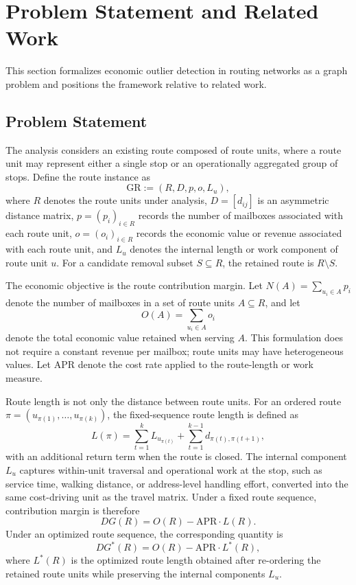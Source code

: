 \documentclass[preprint,12pt]{elsarticle}
\begin{document}
\section{Problem Statement and Related Work}
\label{sec:problem-statement-related-work}

This section formalizes economic outlier detection in routing networks as a graph problem and positions the framework relative to related work.

\subsection{Problem Statement}
\label{subsec:problem-statement}

The analysis considers an existing route composed of route units, where a route unit may represent either a single stop or an operationally aggregated group of stops. Define the route instance as
\[
\mathrm{GR}:=(R,D,p,o,L_u),
\]
where $R$ denotes the route units under analysis, $D = [d_{ij}]$ is an asymmetric distance matrix, $p=(p_i)_{i \in R}$ records the number of mailboxes associated with each route unit, $o=(o_i)_{i\in R}$ records the economic value or revenue associated with each route unit, and $L_u$ denotes the internal length or work component of route unit $u$. For a candidate removal subset $S \subseteq R$, the retained route is $R \setminus S$.

The economic objective is the route contribution margin. Let $N(A)=\sum_{u_i\in A}p_i$ denote the number of mailboxes in a set of route units $A\subseteq R$, and let
\[
O(A)=\sum_{u_i\in A}o_i
\]
denote the total economic value retained when serving $A$. This formulation does not require a constant revenue per mailbox; route units may have heterogeneous values. Let $\mathrm{APR}$ denote the cost rate applied to the route-length or work measure.

Route length is not only the distance between route units. For an ordered route $\pi=(u_{\pi(1)},\ldots,u_{\pi(k)})$, the fixed-sequence route length is defined as
\[
L(\pi)=
\sum_{t=1}^{k}L_{u_{\pi(t)}}
+\sum_{t=1}^{k-1}d_{\pi(t),\pi(t+1)} ,
\]
with an additional return term when the route is closed. The internal component $L_u$ captures within-unit traversal and operational work at the stop, such as service time, walking distance, or address-level handling effort, converted into the same cost-driving unit as the travel matrix. Under a fixed route sequence, contribution margin is therefore
\[
DG(R)=O(R)-\mathrm{APR}\cdot L(R).
\]
Under an optimized route sequence, the corresponding quantity is
\[
DG^*(R)=O(R)-\mathrm{APR}\cdot L^*(R),
\]
where $L^*(R)$ is the optimized route length obtained after re-ordering the retained route units while preserving the internal components $L_u$.
\end{document}
